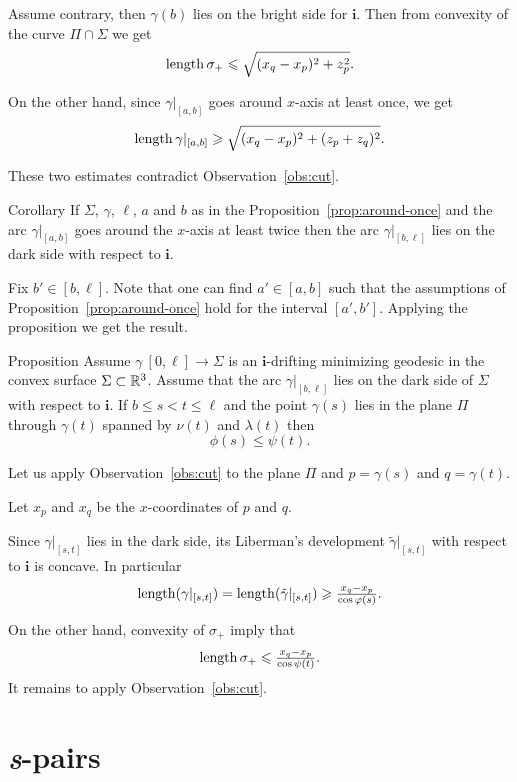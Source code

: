 \documentclass[a4paper,10pt]{article}
\begin{document}
Assume contrary,
then $\gamma(b)$ lies on the bright side for $\bm{i}$.
Then from convexity of the curve $\Pi\cap \Sigma$
we get 
\[\mathop{\rm length}\nolimits\sigma_+\leqslant \sqrt{(x_q-x_p)^2+z_p^2}.\]

On the other hand, since $\gamma|_{[a,b]}$ goes around $x$-axis at least once,
we get 
\[\mathop{\rm length}\nolimits\gamma|_{[a,b]}\geqslant \sqrt{(x_q-x_p)^2+(z_p+z_q)^2}.\]

These two estimates contradict Observation~\ref{obs:cut}.
\qeds

\begin{thm}{Corollary}\label{cor:around-twice}
If $\Sigma$, $\gamma$, $\ell$, $a$ and $b$ as in the Proposition~\ref{prop:around-once} and the arc $\gamma|_{[a,b]}$ goes around the $x$-axis at least twice
then the arc $\gamma|_{[b,\ell]}$ lies on the dark side with respect to $\bm{i}$.
\end{thm}

Fix $b'\in [b,\ell]$.
Note that one can find $a'\in [a,b]$ 
such that the assumptions of Proposition~\ref{prop:around-once} hold for the interval $[a',b']$. 
Applying the proposition we get the result.
\qeds 


\begin{thm}{Proposition}\label{prop:phi-psi}
Assume $\gamma\:[0,\ell]\to \Sigma$ is an $\bm{i}$-drifting minimizing geodesic 
in the convex surface $\Sigma\subset \mathbb{R}^3$.
Assume that the arc $\gamma|_{[b,\ell]}$ 
lies on the dark side of $\Sigma$ with respect to $\bm{i}$.
If $b\le s<t\le \ell$ and the point $\gamma(s)$ lies in the plane $\Pi$ through $\gamma(t)$ spanned by $\nu(t)$ and $\lambda(t)$
then 
\[\phi(s)\le \psi(t).\]
\end{thm}

Let us apply Observation~\ref{obs:cut} to the plane $\Pi$ and $p=\gamma(s)$ and $q=\gamma(t)$.

Let $x_p$ and $x_q$ be the $x$-coordinates of $p$ and $q$.

Since $\gamma|_{[s,t]}$ lies in the dark side,
its Liberman's development $\tilde\gamma|_{[s,t]}$ 
with respect to $\bm{i}$ is concave.
In particular 
\[\mathop{\rm length}\nolimits(\gamma|_{[s,t]})
=
\mathop{\rm length}\nolimits(\tilde\gamma|_{[s,t]})
\geqslant
\tfrac{x_q-x_p}{\cos\varphi(s)}.\]

On the other hand, convexity of $\sigma_+$ imply that
\[\mathop{\rm length}\nolimits\sigma_+\leqslant \tfrac{x_q-x_p}{\cos\psi(t)}.\]
It remains to apply Observation~\ref{obs:cut}.
\qeds

\section{\textit{s}-pairs}
\end{document}

